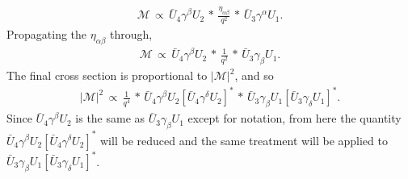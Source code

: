 \begin{align*}
\mathcal{M} \, \propto \, \bar{U}_4\gamma^\beta U_2 \, * \, \frac{\eta_{\alpha\beta}}{q^2}\, *\, \bar{U}_3\gamma^\alpha U_1.
\end{align*}
Propagating the $\eta_{\alpha\beta}$ through,
\begin{align*}
\mathcal{M} \, \propto \, \bar{U}_4\gamma^\beta U_2 \, * \, \frac{1}{q^2}\, *\, \bar{U}_3\gamma_\beta U_1.
\end{align*}
The final cross section is proportional to $|\mathcal{M}|^2$, and so
\begin{align*}
|\mathcal{M}|^2 \, \propto \, \frac{1}{q^4}\, *\, \bar{U}_4\gamma^\beta U_2 [\bar{U}_4\gamma^\delta U_2]^* \, * \,  \bar{U}_3\gamma_\beta U_1 [\bar{U}_3\gamma_\delta U_1]^*.
\end{align*}
Since $\bar{U}_4\gamma^\beta U_2$ is the same as $\bar{U}_3\gamma_\beta U_1$ except for notation, from here the quantity $\bar{U}_4\gamma^\beta U_2 [\bar{U}_4\gamma^\delta U_2]^* $ will be reduced and the same treatment will be applied to $\bar{U}_3\gamma_\beta U_1 [\bar{U}_3\gamma_\delta U_1]^*$.

